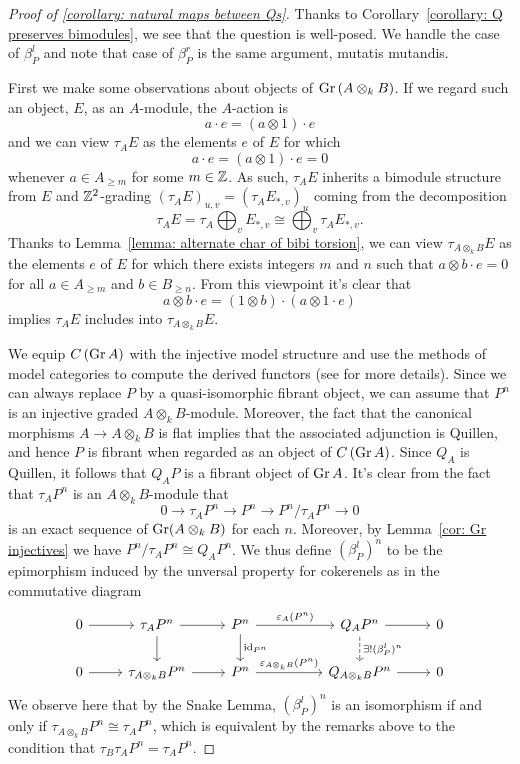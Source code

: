 \begin{proof}[Proof of {\ref{corollary: natural maps between Qs}}]
  Thanks to Corollary~\ref{corollary: Q preserves bimodules}, we see that the question is well-posed. We handle the case of \(\beta^l_P\) and note that case of \(\beta^r_P\) is the same argument, mutatis mutandis.

  First we make some observations about objects of \(\operatorname{Gr}\left(A \otimes_k B\right)\).
  If we regard such an object, \(E\), as an \(A\)-module, the \(A\)-action is
  \[a \cdot e = (a \otimes 1) \cdot e\]
  and we can view \(\tau_A E\) as the elements \(e\) of \(E\) for which
  \[a \cdot e = (a \otimes 1) \cdot e = 0\]
  whenever \(a \in A_{\geq m}\) for some \(m \in \mathbb{Z}\).
  As such, \(\tau_A E\) inherits a bimodule structure from \(E\) and \(\mathbb{Z}^2\)-grading \((\tau_A E)_{u,v} = (\tau_A E_{*,v})_u\) coming from the decomposition
  \[\tau_A E = \tau_A \bigoplus_v E_{\ast,v} \cong \bigoplus_v \tau_A E_{\ast,v}.\]
  Thanks to Lemma~\ref{lemma: alternate char of bibi torsion}, we can view \(\tau_{A \otimes_k B} E\) as the elements \(e\) of \(E\) for which there exists integers \(m\) and \(n\) such that \(a \otimes b \cdot e = 0\) for all \(a \in A_{\geq m}\) and \(b \in B_{\geq n}\).
  From this viewpoint it's clear that
  \[a \otimes b \cdot e = (1 \otimes b) \cdot (a \otimes 1 \cdot e)\]
  implies \(\tau_A E\) includes into \(\tau_{A \otimes_k B} E\).

  We equip \(C\left(\operatorname{Gr}A\right)\) with the injective model structure and use the methods of model categories to compute the derived functors (see \cite{Hovey01} for more details).
  Since we can always replace \(P\) by a quasi-isomorphic fibrant object, we can assume that \(P^n\) is an injective graded \(A \otimes_k B\)-module.
  Moreover, the fact that the canonical morphisms \(A \to A \otimes_k B\) is flat implies that the associated adjunction is Quillen, and hence \(P\) is fibrant when regarded as an object of  \(C\left(\operatorname{Gr}A\right)\).
  Since \(Q_A\) is Quillen, it follows that \(Q_A P\) is a fibrant object of \(\operatorname{Gr}A\).
  It's clear from the fact that \(\tau_A P^n\) is an \(A \otimes_k B\)-module that   \[0 \to \tau_A P^n \to P^n \to P^n/\tau_A P^n \to 0\]
  is an exact sequence of \(\operatorname{Gr}(A \otimes_k B)\) for each \(n\).
  Moreover, by Lemma~\ref{cor: Gr injectives} we have \(P^n/\tau_A P^n \cong Q_A P^n\).
  We thus define \((\beta^l_P)^n\) to be the epimorphism induced by the unversal property for cokerenels as in the commutative diagram
  \[\begin{tikzcd}
  0 \arrow{r} & \tau_{A} P^n \arrow{d}\arrow{r} & P^n \arrow{d}{\id_{P^n}}\arrow{rr}{\varepsilon_{A}(P^n)} && Q_{A} P^n \arrow{r}\arrow[dashed]{d}{\exists ! (\beta^l_P)^n} & 0\\
  0 \arrow{r} & \tau_{A \otimes_k B} P^n \arrow{r} & P^n\arrow{rr}{\varepsilon_{A \otimes_k B}(P^n)} && Q_{A \otimes_k B} P^n \arrow{r} & 0 
  \end{tikzcd}\]  We observe here that by the Snake Lemma, \((\beta^l_P)^n\) is an isomorphism if and only if \(\tau_{A \otimes_k B} P^n \cong \tau_A P^n\), which is equivalent by the remarks above to the condition that \(\tau_B \tau_A P^n = \tau_A P^n\).


\end{proof}
